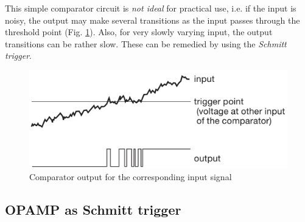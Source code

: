 This simple comparator circuit is \textit{not ideal} for practical use, i.e. if the input is noisy, the output may make several transitions as the input passes through the threshold point (Fig. \ref{comp3}). Also, for very slowly varying input, the output transitions can be rather slow. These can be remedied by using the \textit{Schmitt trigger}.

\begin{figure}[H]
    \centering
    \includegraphics[width=0.85\columnwidth]{images/comp3.png}
    \caption{Comparator output for the corresponding input signal}
    \label{comp3}
\end{figure}




\subsection{OPAMP as Schmitt trigger}

